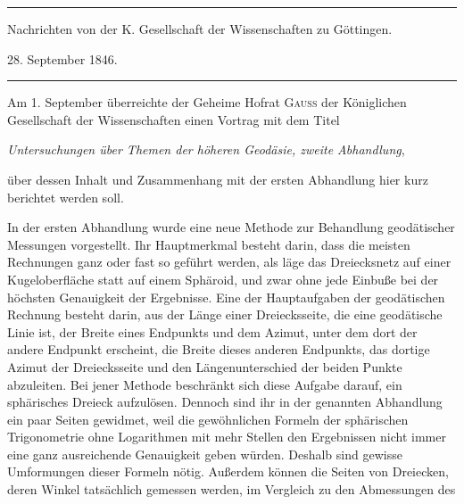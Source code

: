 \begin{center}
\rule{.85\textwidth}{.3pt}\par
Nachrichten von der K. Gesellschaft der Wissenschaften zu Göttingen.\par 28. September 1846.\par
\rule{.85\textwidth}{.3pt}
\end{center}
\hspace*{\parindent}Am 1. September überreichte der Geheime Hofrat \textsc{Gauss} der Königlichen Gesellschaft der Wissenschaften einen Vortrag mit dem Titel
\begin{center}\textit{Untersuchungen über Themen der höheren Geodäsie, zweite Abhandlung},\end{center}
\noindent über dessen Inhalt und Zusammenhang mit der ersten Abhandlung hier kurz berichtet werden soll.

In der ersten Abhandlung wurde eine neue Methode zur Behandlung geodätischer Messungen vorgestellt. Ihr Hauptmerkmal besteht darin, dass die meisten Rechnungen ganz oder fast so geführt werden, als läge das Dreiecksnetz auf einer Kugeloberfläche statt auf einem Sphäroid, und zwar ohne jede Einbuße bei der höchsten Genauigkeit der Ergebnisse. Eine der Hauptaufgaben der geodätischen Rechnung besteht darin, aus der Länge einer Dreiecksseite, die eine geodätische Linie ist, der Breite eines Endpunkts und dem Azimut, unter dem dort der andere Endpunkt erscheint, die Breite dieses anderen Endpunkts, das dortige Azimut der Dreiecksseite und den Längenunterschied der beiden Punkte abzuleiten. Bei jener Methode beschränkt sich diese Aufgabe darauf, ein sphärisches Dreieck aufzulösen. Dennoch sind ihr in der genannten Abhandlung ein paar Seiten gewidmet, weil die gewöhnlichen Formeln der sphärischen Trigonometrie ohne Logarithmen mit mehr Stellen den Ergebnissen nicht immer eine ganz ausreichende Genauigkeit geben würden. Deshalb sind gewisse Umformungen dieser Formeln nötig. Außerdem können die Seiten von Dreiecken, deren Winkel tatsächlich gemessen werden, im Vergleich zu den Abmessungen des %
